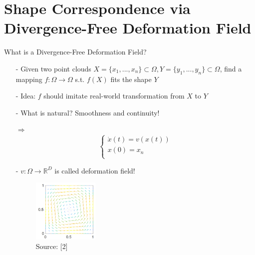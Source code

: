 \documentclass[xcolor=dvipsnames]{beamer}
\begin{document}
\section{Shape Correspondence via Divergence-Free Deformation Field}
\begin{frame}{What is a Divergence-Free Deformation Field?}
\begin{enumerate}
\item[-]Given two point clouds $X=\{x_1,...,x_n\} \subset \Omega, Y=\{y_1,...,y_n\}\subset \Omega$, find a mapping $f: \Omega \rightarrow \Omega$ s.t. $f(X)$ fits the shape $Y$
\item[-]Idea: $f$ should imitate real-world transformation from $X$ to $Y$
\pause
\item[-] What is natural? Smoothness and continuity!
\item[$\Rightarrow$]  \begin{equation*}
  	\begin{cases}
    \dot{x}(t) = v(x(t)) \\
    x(0) = x_n \\
    \end{cases}
    \end{equation*}
\item[-] $v: \Omega \rightarrow \mathbb{R}^D$ is called deformation field!
\begin{figure}
\includegraphics[height=3cm]{Pictures/deformation.png}
\caption*{Source: [2]}
\end{figure}
\end{enumerate}
\end{frame}
\end{document}
